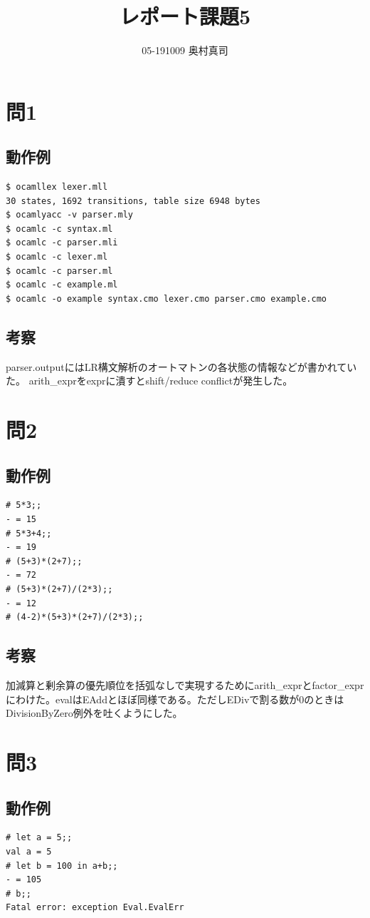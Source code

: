 \documentclass[11pt,a4paper]{jsarticle}
\title{レポート課題5}
\author{05-191009 奥村真司}
\date{}
\begin{document}
\maketitle
%
%
\section*{問1}
\subsection*{動作例}
\begin{lstlisting}[basicstyle=\ttfamily\footnotesize, frame=single]
$ ocamllex lexer.mll 
30 states, 1692 transitions, table size 6948 bytes
$ ocamlyacc -v parser.mly 
$ ocamlc -c syntax.ml 
$ ocamlc -c parser.mli
$ ocamlc -c lexer.ml
$ ocamlc -c parser.ml
$ ocamlc -c example.ml
$ ocamlc -o example syntax.cmo lexer.cmo parser.cmo example.cmo
\end{lstlisting}
\subsection*{考察}
parser.outputにはLR構文解析のオートマトンの各状態の情報などが書かれていた。
arith\_exprをexprに潰すとshift/reduce conflictが発生した。
\section*{問2}
\subsection*{動作例}
\begin{lstlisting}[basicstyle=\ttfamily\footnotesize, frame=single]
# 5*3;;
- = 15
# 5*3+4;;
- = 19
# (5+3)*(2+7);;
- = 72
# (5+3)*(2+7)/(2*3);;
- = 12
# (4-2)*(5+3)*(2+7)/(2*3);;
\end{lstlisting}
\subsection*{考察}
加減算と剰余算の優先順位を括弧なしで実現するためにarith\_exprとfactor\_exprにわけた。evalはEAddとほぼ同様である。ただしEDivで割る数が0のときはDivisionByZero例外を吐くようにした。
\section*{問3}
\subsection*{動作例}
\begin{lstlisting}[basicstyle=\ttfamily\footnotesize, frame=single]
# let a = 5;;
val a = 5
# let b = 100 in a+b;;
- = 105
# b;;
Fatal error: exception Eval.EvalErr
\end{lstlisting}
\end{document}
